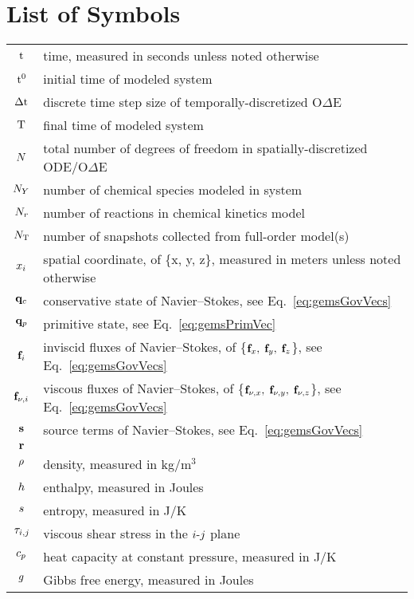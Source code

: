 \chapter*{List of Symbols}

\begin{longtable}{cp{}}
	$\text{t}$ & time, measured in seconds unless noted otherwise \\
	$\text{t}^0$ & initial time of modeled system \\
	$\Delta \text{t}$ & discrete time step size of temporally-discretized O$\Delta$E \\
	$\text{T}$ & final time of modeled system \\
	$N$ & total number of degrees of freedom in spatially-discretized ODE/O$\Delta$E \\
	$N_Y$ & number of chemical species modeled in system\\
	$N_r$ & number of reactions in chemical kinetics model \\
	$N_{\text{T}}$ & number of snapshots collected from full-order model(s) \\
	$x_{i}$ & spatial coordinate, of \{x, y, z\}, measured in meters unless noted otherwise \\
	$\mathbf{q}_c$ & conservative state of Navier--Stokes, see Eq.~\ref{eq:gemsGovVecs} \\
	$\mathbf{q}_p$ & primitive state, see Eq.~\ref{eq:gemsPrimVec}  \\
	$\mathbf{f}_{i}$ & inviscid fluxes of Navier--Stokes, of \{$\mathbf{f}_x, \; \mathbf{f}_y, \; \mathbf{f}_z$\}, see Eq.~\ref{eq:gemsGovVecs} \\
	$\mathbf{f}_{\nu,i}$ & viscous fluxes of Navier--Stokes, of \{$\mathbf{f}_{\nu,x}, \;\mathbf{f}_{\nu,y}, \; \mathbf{f}_{\nu,z}$\}, see Eq.~\ref{eq:gemsGovVecs} \\
	$\mathbf{s}$ & source terms of Navier--Stokes, see Eq.~\ref{eq:gemsGovVecs} \\
	$\mathbf{r}$ & \\
	$\rho$ & density, measured in kg/m$^3$ \\
	$h$ & enthalpy, measured in Joules \\
	$s$ & entropy, measured in J/K \\
	$\tau_{i,j}$ & viscous shear stress in the $i\text{-}j$ plane \\
	$c_{p}$ & heat capacity at constant pressure, measured in J/K \\
	$g$ & Gibbs free energy, measured in Joules\\

\end{longtable}
